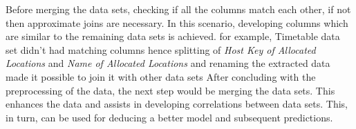 Before merging the data sets, checking if all the columns match each other, if not then approximate joins are necessary. In this scenario, developing columns which are similar to the remaining data sets is achieved. for example, Timetable data set didn't had matching columns hence splitting of \textit{Host Key of Allocated Locations} and \textit{Name of Allocated Locations} and renaming the extracted data made it possible to join it with other data sets
After concluding with the preprocessing of the data, the next step would be merging the data sets. This enhances the data and assists in developing correlations between data sets. This, in turn, can be used for deducing a better model and subsequent predictions.